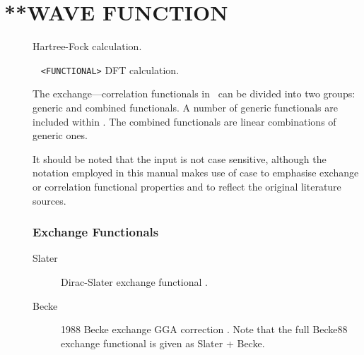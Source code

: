\section{**WAVE FUNCTION}\label{sec:wavefunc}
\begin{description}
\item[] Hartree-Fock calculation.
\item[] \verb| | \newline
\verb|<FUNCTIONAL>|\newline
DFT calculation.

The exchange---correlation functionals in \lsdalton\ can be divided into two groups: 
generic and combined functionals. 
A number of generic functionals are included within \lsdalton. 
The combined functionals are linear combinations of generic ones.

It should be noted that the input is not case sensitive, although the notation
employed in this manual makes use of case to emphasise exchange or correlation 
functional properties and to reflect the original literature sources.

\subsubsection{Exchange Functionals}
\providecommand\exfn[1]{#1}

\begin{description}
\item[Slater] Dirac-Slater exchange functional \cite{dft:hohenberg,dft:kohn,dft:slater}.

\item[Becke] 1988 Becke exchange GGA correction \cite{dft:becke88}. Note that the full Becke88 exchange functional is given as \exfn{Slater} + \exfn{Becke}.





\end{description}
\end{description}
